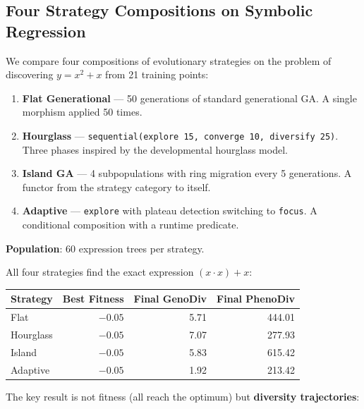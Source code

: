 \documentclass[10pt]{article}
\begin{document}
\subsection{Four Strategy Compositions on Symbolic Regression}

We compare four compositions of evolutionary strategies on the problem of discovering $y = x^2 + x$ from 21 training points:

\begin{enumerate}
  \item \textbf{Flat Generational} --- 50 generations of standard generational GA. A single morphism applied 50 times.
  \item \textbf{Hourglass} --- \texttt{sequential(explore 15, converge 10, diversify 25)}. Three phases inspired by the developmental hourglass model.
  \item \textbf{Island GA} --- 4 subpopulations with ring migration every 5 generations. A functor from the strategy category to itself.
  \item \textbf{Adaptive} --- \texttt{explore} with plateau detection switching to \texttt{focus}. A conditional composition with a runtime predicate.
\end{enumerate}

\textbf{Population}: 60 expression trees per strategy.

All four strategies find the exact expression $(x \cdot x) + x$:

\begin{table}[ht]
\centering
\begin{tabular}{@{}lrrr@{}}
\toprule
\textbf{Strategy} & \textbf{Best Fitness} & \textbf{Final GenoDiv} & \textbf{Final PhenoDiv} \\
\midrule
Flat      & $-0.05$ & 5.71  & 444.01 \\
Hourglass & $-0.05$ & 7.07  & 277.93 \\
Island    & $-0.05$ & 5.83  & 615.42 \\
Adaptive  & $-0.05$ & 1.92  & 213.42 \\
\bottomrule
\end{tabular}
\end{table}

The key result is not fitness (all reach the optimum) but \textbf{diversity trajectories}:
\end{document}
